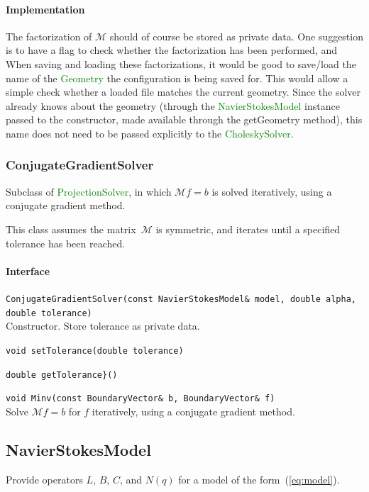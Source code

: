 \documentclass[11pt]{article}
\def\class#1{\textcolor{green}{\ttfamily\small #1}} %
\def\fn#1{{\ttfamily\small #1}} %
\let\code\lstinline
\begin{document}
\paragraph{Implementation}
The factorization of $\mathcal{M}$ should of course be stored as private data.  One suggestion is to have a flag to check whether the factorization has been performed, and When saving and loading these factorizations, it would be good to save/load the name of the \class{Geometry} the configuration is being saved for.  This would allow a simple check whether a loaded file matches the current geometry.  Since the solver already knows about the geometry (through the \class{NavierStokesModel} instance passed to the constructor, made available through the \fn{getGeometry} method), this name does not need to be passed explicitly to the \class{CholeskySolver}.

\subsubsection{ConjugateGradientSolver}
Subclass of \class{ProjectionSolver}, in which $\mathcal{M}f=b$ is solved iteratively, using a conjugate gradient method.

This class assumes the matrix~$\mathcal{M}$ is symmetric, and iterates until a specified tolerance has been reached.

\paragraph{Interface}
\begin{description}
	\item \code|ConjugateGradientSolver(const NavierStokesModel& model, double alpha, double tolerance)|\\
		Constructor.  Store tolerance as private data.
	\item \code|void setTolerance(double tolerance)|
	\item \code|double getTolerance}()|
	\item \code|void Minv(const BoundaryVector& b, BoundaryVector& f)|\\
		Solve $\mathcal{M}f = b$ for $f$ iteratively, using a conjugate gradient method.
\end{description}


\subsection{NavierStokesModel}
Provide operators $L$, $B$, $C$, and $N(q)$ for a model of the form~(\ref{eq:model}).
\end{document}
